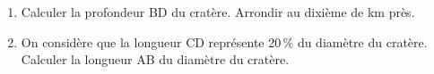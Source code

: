 \begin{enumerate}
	\begin{enumerate}
		\item Calculer la profondeur BD du cratère. Arrondir au dixième de km près. 
		\item On considère que la longueur CD représente 20\,\% du diamètre du cratère. Calculer la longueur AB du diamètre du cratère.
	\end{enumerate} 
\end{enumerate} 

\newpage

